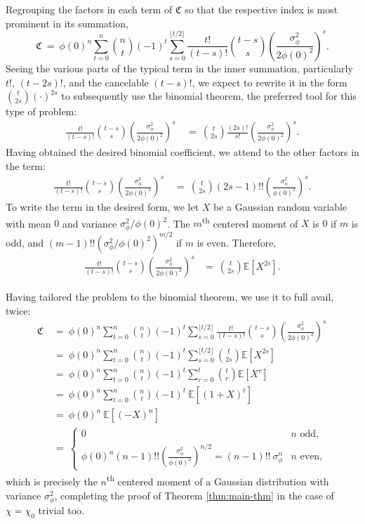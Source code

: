 \documentclass[12pt, reqno,oneside]{amsart}
\theoremstyle{plain}
\theoremstyle{definition}
\theoremstyle{remark}
\theoremstyle{plain}
\numberwithin{equation}{section}
\begin{document}
Regrouping the factors in each term of $\mathfrak{C}$ so that the respective index is most prominent in its summation,
\begin{equation}
\mathfrak{C} \ = \ \phi(0)^n\sum_{t=0}^n\binom{n}{t}(-1)^t\sum_{s=0}^{\lfloor t/2\rfloor}\frac{t!}{(t-s)!}\binom{t-s}{s}\left(\frac{\sigma_\phi^2}{2\phi(0)^2}\right)^{s}.
\end{equation}
Seeing the various parts of the typical term in the inner summation, particularly $t!$, $(t-2s)!$, and the cancelable $(t-s)!$, we expect to rewrite it in the form $\binom{t}{2s}(\cdot)^{2s}$ to subsequently use the binomial theorem, the preferred tool for this type of problem:
\begin{align}
\frac{t!}{(t-s)!}\binom{t-s}{s}\left(\frac{\sigma_\phi^2}{2\phi(0)^2}\right)^{s} \ 
&= \ \binom{t}{2s}\frac{(2s)!}{s!}\left(\frac{\sigma_\phi^2}{2\phi(0)^2}\right)^{s}.
\end{align}
Having obtained the desired binomial coefficient, we attend to the other factors in the term:
\begin{align}
\frac{t!}{(t-s)!}\binom{t-s}{s}\left(\frac{\sigma_\phi^2}{2\phi(0)^2}\right)^{s} \ 
&= \ \binom{t}{2s}(2s-1)!!\left(\frac{\sigma_\phi^2}{\phi(0)^2}\right)^{s}.
\end{align}
To write the term in the desired form, we let $X$ be a Gaussian random variable with mean $0$ and variance $\sigma_\phi^2/\phi(0)^2$. The $m$\textsuperscript{th} centered moment of $X$ is $0$ if $m$ is odd, and $(m-1)!!(\sigma_\phi^2/\phi(0)^2)^{m/2}$ if $m$ is even. Therefore,
\begin{align}
\frac{t!}{(t-s)!}\binom{t-s}{s}\left(\frac{\sigma_\phi^2}{2\phi(0)^2}\right)^{s} 
&= \ \binom{t}{2s}\mathbb{E}\left[X^{2s}\right].
\end{align}

Having tailored the problem to the binomial theorem, we use it to full avail, twice:
\begin{align}
\nonumber
\mathfrak{C} \ &= \ \phi(0)^n\sum_{t=0}^n\binom{n}{t}(-1)^t\sum_{s=0}^{\lfloor t/2\rfloor}\frac{t!}{(t-s)!}\binom{t-s}{s}\left(\frac{\sigma_\phi^2}{2\phi(0)^2}\right)^{s}\\
\nonumber
&= \ \phi(0)^n\sum_{t=0}^n\binom{n}{t}(-1)^t\sum_{s=0}^{\lfloor t/2\rfloor}\binom{t}{2s}\mathbb{E}\left[X^{2s}\right]\\
\nonumber
&= \ \phi(0)^n\sum_{t=0}^n\binom{n}{t}(-1)^t\sum_{r=0}^{t}\binom{t}{r}\mathbb{E}\left[X^{r}\right]\\
\nonumber
&= \ \phi(0)^n\sum_{t=0}^n\binom{n}{t}(-1)^t \ \mathbb{E}\left[(1+X)^t\right]\\
\nonumber
&= \ \phi(0)^n \ \mathbb{E}\left[(-X)^n\right]\\
&= \ \begin{cases}
0 & n \text{ odd}, \\
\phi(0)^{n}(n-1)!!\left(\frac{\sigma_\phi^2}{\phi(0)^2}\right)^{n/2}=(n-1)!! \ \sigma_\phi^{n}& n\text{ even},
\end{cases}
\end{align}
which is precisely the $n$\textsuperscript{th} centered moment of a Gaussian distribution with variance $\sigma_\phi^2$, completing the proof of Theorem \ref{thm:main-thm} in the case of $\chi=\chi_0$ trivial too. 
\end{document}
